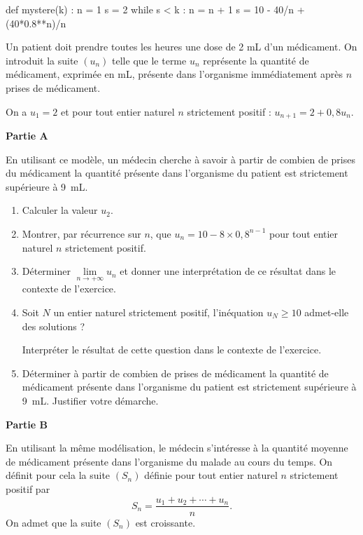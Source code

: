 \begin{scontents}[overwrite,write-out=asie2025j1exo3.py]
def mystere(k) :
	n = 1
	s = 2
	while s < k :
		n = n + 1
		s = 10 - 40/n + (40*0.8**n)/n
\end{scontents}


Un patient doit prendre toutes les heures une dose de 2 mL d'un médicament. On introduit la suite $\left(u_{n}\right)$ telle que le terme $u_{n}$ représente la quantité de médicament, exprimée en mL, présente dans l'organisme immédiatement après $n$ prises de médicament.

On a $u_{1}=2$ et pour tout entier naturel $n$ strictement positif : $u_{n+1}=2+0,8 u_{n}$.

\medskip

\textbf{Partie A}

\medskip

En utilisant ce modèle, un médecin cherche à savoir à partir de combien de prises du médicament la quantité présente dans l'organisme du patient est strictement supérieure à 9~mL.

\begin{enumerate}
	\item Calculer la valeur $u_{2}$.
	\item Montrer, par récurrence sur $n$, que $u_{n}=10-8 \times 0,8^{n-1}$ pour tout entier naturel $n$ strictement positif.
	\item Déterminer $\lim\limits_{n \to +\infty} u_{n}$ et donner une interprétation de ce résultat dans le contexte de l'exercice.
	\item Soit $N$ un entier naturel strictement positif, l'inéquation $u_{N} \geqslant 10$ admet-elle des solutions ?
	
	Interpréter le résultat de cette question dans le contexte de l'exercice.
	\item Déterminer à partir de combien de prises de médicament la quantité de médicament présente dans l'organisme du patient est strictement supérieure à 9~mL. Justifier votre démarche.
\end{enumerate}

\textbf{Partie B}

\medskip

En utilisant la même modélisation, le médecin s'intéresse à la quantité moyenne de médicament présente dans l'organisme du malade au cours du temps. On définit pour cela la suite $\left(S_{n}\right)$ définie pour tout entier naturel $n$ strictement positif par \[ S_{n}=\frac{u_{1}+u_{2}+\cdots+u_{n}}{n}. \]
%
On admet que la suite $\left(S_{n}\right)$ est croissante.

